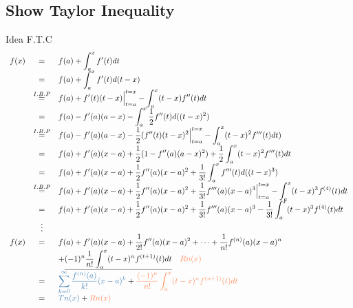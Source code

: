 \subsection*{Show Taylor Inequality}
Idea F.T.C
\[\begin{array}{rcl}
f(x) & = & \displaystyle f(a) + \int^x_a f'(t)dt\\
& = & \displaystyle f(a) + \int^x_a f'(t)d(t-x)\\
& \overset{I.B.P}{=} & \displaystyle f(a) + f'(t)(t-x) \Big|^{t = x}_{t = a} - \int^x_a (t - x)f''(t)dt\\
& = & \displaystyle f(a) - f'(a)(a -x) - \int^x_a \frac{1}{2} f''(t) d((t-x)^2)\\
& \overset{I.B.P}{=} & \displaystyle f(a) - f'(a)(a - x) - \frac{1}{2} ( f''(t)(t - x)^2 \Big|^{t = x}_{t = a} - \int^x_a (t - x)^2 f'''(t)dt)\\
& = & \displaystyle f(a) + f'(a)(x - a) + \frac{1}{2}(1 - f''(a)(a - x)^2) + \frac{1}{2}\int^x_a (t - x)^2f'''(t)dt\\
& = & \displaystyle f(a) + f'(a)(x - a) + \frac{1}{2} f''(a)(x - a)^2 + \frac{1}{3!} \int^x_a f'''(t)d((t - x)^3)\\
& \overset{I.B.P}{=} & \displaystyle f(a) + f'(a)(x - a) + \frac{1}{2}f''(a)(x - a)^2 + \frac{1}{3!} f'''(a)(x - a)^3 \Big|^{t = x}_{t = a} - \int^x_a (t - x)^3 f^{(4)}(t)dt\\
& = & \displaystyle f(a) + f'(a)(x -a) + \frac{1}{2} f''(a)(x - a)^2 + \frac{1}{3!}f'''(a)(x -a)^3 - \frac{1}{3!} \int^x_a (t - x)^3 f^{(4)}(t)dt\\
& \vdots &\\
f(x) & = & \displaystyle f(a) + f'(a)(x - a) + \frac{1}{2!} f''(a)(x - a)^2 + \cdots + \frac{1}{n!} f^{(n)}(a) (x - a)^n\\
&& \displaystyle + \underline{(-1)^n \frac{1}{n!} \int^x_a (t - x)^n f^{(t + 1)}(t)dt} \quad \tsorange{Rn(x)}\\
& = & \displaystyle \tssteelblue{\sum^{\infty}_{k = 0} \frac{f^{(n)}(a)}{k!} (x - a)^k} + \tsorange{\frac{(-1)^n}{n!} \int^x_a (t - x)^n f^{(n + 1)}(t)dt}\\
& = & \tssteelblue{Tn(x)} + \tsorange{Rn(x)}
\end{array}\]
